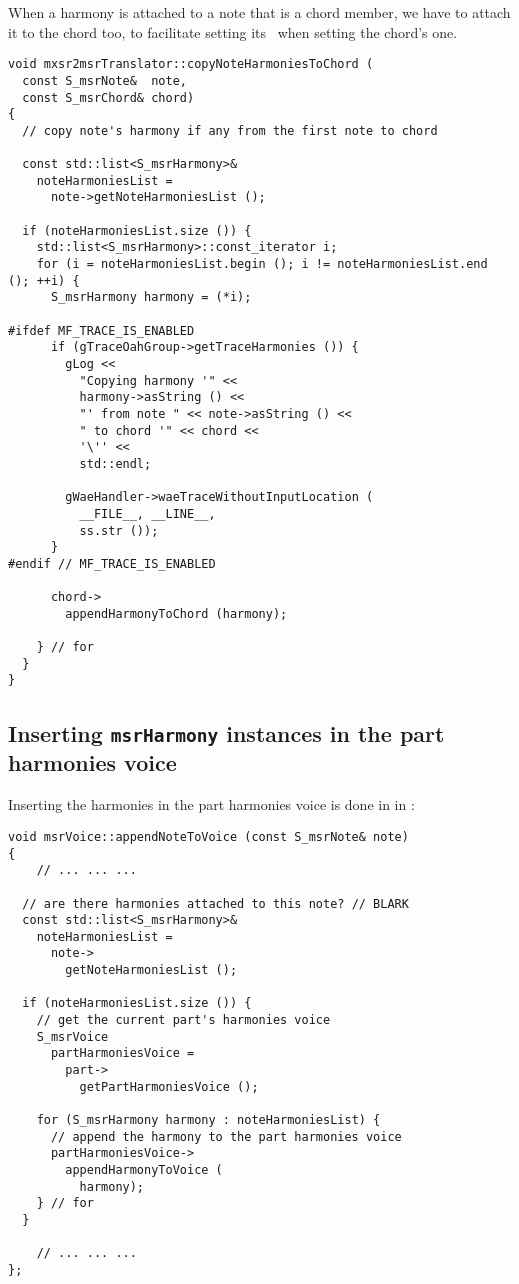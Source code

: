 When a harmony is attached to a note that is a chord member, we have to attach it to the chord too, to facilitate setting its \pim\ when setting the chord's one.
\begin{lstlisting}[language=CPlusPlus]
void mxsr2msrTranslator::copyNoteHarmoniesToChord (
  const S_msrNote&  note,
  const S_msrChord& chord)
{
  // copy note's harmony if any from the first note to chord

  const std::list<S_msrHarmony>&
    noteHarmoniesList =
      note->getNoteHarmoniesList ();

  if (noteHarmoniesList.size ()) {
    std::list<S_msrHarmony>::const_iterator i;
    for (i = noteHarmoniesList.begin (); i != noteHarmoniesList.end (); ++i) {
      S_msrHarmony harmony = (*i);

#ifdef MF_TRACE_IS_ENABLED
      if (gTraceOahGroup->getTraceHarmonies ()) {
        gLog <<
          "Copying harmony '" <<
          harmony->asString () <<
          "' from note " << note->asString () <<
          " to chord '" << chord <<
          '\'' <<
          std::endl;

        gWaeHandler->waeTraceWithoutInputLocation (
          __FILE__, __LINE__,
          ss.str ());
      }
#endif // MF_TRACE_IS_ENABLED

      chord->
        appendHarmonyToChord (harmony);

    } // for
  }
}
\end{lstlisting}


\subsection{Inserting {\tt msrHarmony} instances in the part harmonies voice}

Inserting the harmonies in the part harmonies voice is done in  in :
\begin{lstlisting}[language=CPlusPlus]
void msrVoice::appendNoteToVoice (const S_msrNote& note)
{
	// ... ... ...

  // are there harmonies attached to this note? // BLARK
  const std::list<S_msrHarmony>&
    noteHarmoniesList =
      note->
        getNoteHarmoniesList ();

  if (noteHarmoniesList.size ()) {
    // get the current part's harmonies voice
    S_msrVoice
      partHarmoniesVoice =
        part->
          getPartHarmoniesVoice ();

    for (S_msrHarmony harmony : noteHarmoniesList) {
      // append the harmony to the part harmonies voice
      partHarmoniesVoice->
        appendHarmonyToVoice (
          harmony);
    } // for
  }

	// ... ... ...
};
\end{lstlisting}


